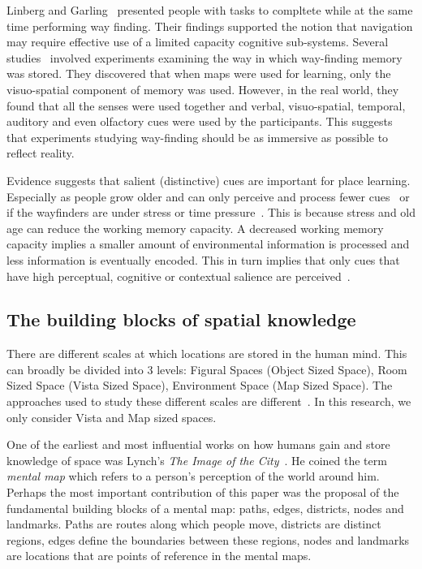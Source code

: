 Linberg and Garling~\cite{lindberg1981acquisition} presented people with tasks to compltete while at the same time performing way finding. Their findings supported the notion that navigation may require effective use of a limited capacity cognitive sub-systems. Several studies~\cite{Garden1992, meilinger2008working} involved experiments examining the way in which way-finding memory was stored. They discovered that when maps were used for learning, only the visuo-spatial component of memory was used. However, in the real world, they found that all the senses were used together and verbal, visuo-spatial, temporal, auditory and even olfactory cues were used by the participants. This suggests that experiments studying way-finding should be as immersive as possible to reflect reality.


Evidence suggests that salient (distinctive) cues are important for place learning. Especially as people grow older and can only perceive and process fewer cues~\cite{Davis01122009} or if the wayfinders are under stress or time pressure~\cite{Ozel:2001tn}.
This is because stress and old age can reduce the working memory capacity. A decreased working memory capacity implies a smaller amount of environmental information is processed and less information is eventually encoded. This in turn implies that only cues that have high perceptual, cognitive or contextual salience are perceived~\cite{Davis01122009}.

\subsection{The building blocks of spatial knowledge} %
\label{sub:how_people_gain_spatial_information}

There are different scales at which locations are stored in the human mind. This can broadly be divided into 3 levels: Figural Spaces (Object Sized Space), Room Sized Space (Vista Sized Space), Environment Space (Map Sized Space). The approaches used to study these different scales are different~\cite{Sholl:2004vu}. In this research, we only consider Vista and Map sized spaces.


One of the earliest and most influential works on how humans gain and store knowledge of space was Lynch's \emph{The Image of the City}~\cite{lynch_image_1960}. He coined the term \emph{mental map} which refers to a person's perception of the world around him. Perhaps the most important contribution of this paper was the proposal of the fundamental building blocks of a mental map: paths, edges, districts, nodes and landmarks. Paths are routes along which people move, districts are distinct regions, edges define the boundaries between these regions, nodes and landmarks are locations that are points of reference in the mental maps.

